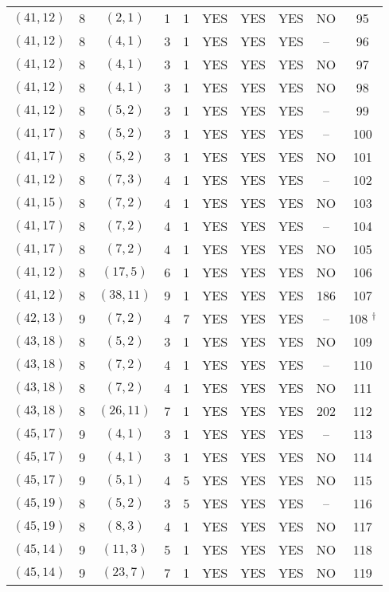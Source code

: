 \begin{longtable}{|c|c|c|c|c|c|c|c|c|c|}
$(41, 12)$ & 8 & $(2, 1)$ & 1 & 1 & YES & YES & YES & NO & 95\\
$(41, 12)$ & 8 & $(4, 1)$ & 3 & 1 & YES & YES & YES & -- & 96\\
$(41, 12)$ & 8 & $(4, 1)$ & 3 & 1 & YES & YES & YES & NO & 97\\
$(41, 12)$ & 8 & $(4, 1)$ & 3 & 1 & YES & YES & YES & NO & 98\\
$(41, 12)$ & 8 & $(5, 2)$ & 3 & 1 & YES & YES & YES & -- & 99\\
$(41, 17)$ & 8 & $(5, 2)$ & 3 & 1 & YES & YES & YES & -- & 100\\
$(41, 17)$ & 8 & $(5, 2)$ & 3 & 1 & YES & YES & YES & NO & 101\\
$(41, 12)$ & 8 & $(7, 3)$ & 4 & 1 & YES & YES & YES & -- & 102\\
$(41, 15)$ & 8 & $(7, 2)$ & 4 & 1 & YES & YES & YES & NO & 103\\
$(41, 17)$ & 8 & $(7, 2)$ & 4 & 1 & YES & YES & YES & -- & 104\\
$(41, 17)$ & 8 & $(7, 2)$ & 4 & 1 & YES & YES & YES & NO & 105\\
$(41, 12)$ & 8 & $(17, 5)$ & 6 & 1 & YES & YES & YES & NO & 106\\
$(41, 12)$ & 8 & $(38, 11)$ & 9 & 1 & YES & YES & YES & 186 & 107\\
$(42, 13)$ & 9 & $(7, 2)$ & 4 & 7 & YES & YES & YES & -- & 108 ${}^\dagger$\\
$(43, 18)$ & 8 & $(5, 2)$ & 3 & 1 & YES & YES & YES & NO & 109\\
$(43, 18)$ & 8 & $(7, 2)$ & 4 & 1 & YES & YES & YES & -- & 110\\
$(43, 18)$ & 8 & $(7, 2)$ & 4 & 1 & YES & YES & YES & NO & 111\\
$(43, 18)$ & 8 & $(26, 11)$ & 7 & 1 & YES & YES & YES & 202 & 112\\
$(45, 17)$ & 9 & $(4, 1)$ & 3 & 1 & YES & YES & YES & -- & 113\\
$(45, 17)$ & 9 & $(4, 1)$ & 3 & 1 & YES & YES & YES & NO & 114\\
$(45, 17)$ & 9 & $(5, 1)$ & 4 & 5 & YES & YES & YES & NO & 115\\
$(45, 19)$ & 8 & $(5, 2)$ & 3 & 5 & YES & YES & YES & -- & 116\\
$(45, 19)$ & 8 & $(8, 3)$ & 4 & 1 & YES & YES & YES & NO & 117\\
$(45, 14)$ & 9 & $(11, 3)$ & 5 & 1 & YES & YES & YES & NO & 118\\
$(45, 14)$ & 9 & $(23, 7)$ & 7 & 1 & YES & YES & YES & NO & 119\\

\end{longtable}
